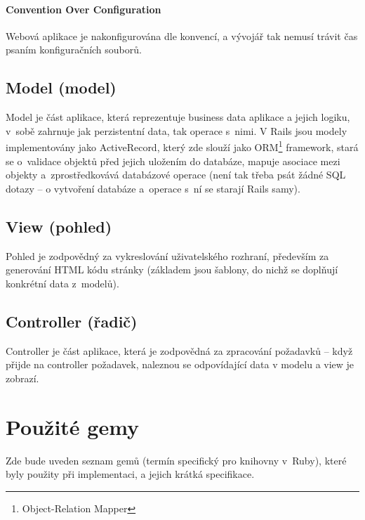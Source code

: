 \documentclass[twoside]{ctuthesis}
\begin{document}
\paragraph{Convention Over Configuration} Webová aplikace je nakonfigurována dle konvencí, a vývojář tak nemusí trávit čas psaním konfiguračních souborů.

\subsection{Model (model)}

Model je část aplikace, která reprezentuje business data aplikace a jejich logiku, v~sobě zahrnuje jak perzistentní data, tak operace s~nimi. V Rails jsou modely implementovány jako ActiveRecord, který zde slouží jako ORM\footnote{Object-Relation Mapper} framework, stará se o~validace objektů před jejich uložením do databáze, mapuje asociace mezi objekty a~zprostředkovává databázové operace (není tak třeba psát žádné SQL dotazy -- o vytvoření databáze a~operace s~ní se starají Rails samy).

\subsection{View (pohled)}

Pohled je zodpovědný za vykreslování uživatelského rozhraní, především za generování HTML kódu stránky (základem jsou šablony, do nichž se doplňují konkrétní data z~modelů).

\subsection{Controller (řadič)}

Controller je část aplikace, která je zodpovědná za zpracování požadavků -- když přijde na controller požadavek, naleznou se odpovídající data v modelu a view je zobrazí.

\section{Použité gemy}

Zde bude uveden seznam gemů (termín specifický pro knihovny v~Ruby), které byly použity při implementaci, a jejich krátká specifikace.
\end{document}
